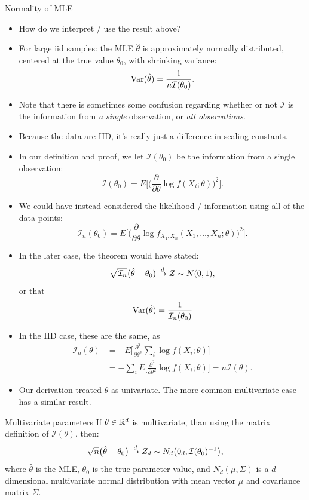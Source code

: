\begin{frame}[allowframebreaks]{Normality of MLE}
  \begin{itemize}
    \item How do we interpret / use the result above?
    \item \alert{For large iid samples:} the MLE $\hat{\theta}$ is approximately normally distributed, centered at the \alert{true} value $\theta_0$, with shrinking variance:
    $$
    \mathrm{Var}(\hat{\theta}) = \frac{1}{n\mathcal{I}(\theta_0)}.
    $$
    \item \alert{Note} that there is sometimes some confusion regarding whether or not $\mathcal{I}$ is the information from \emph{a single} observation, or \emph{all observations}.
    \item Because the data are IID, it's really just a difference in scaling constants.
    \item In our definition and proof, we let $\mathcal{I}(\theta_0)$ be the information from a single observation:
    $$
    \mathcal{I}(\theta_0) = E\Big[\Big(\frac{\partial}{\partial \theta} \log f(X_i; \theta)\Big)^2\Big].
    $$
    \item We could have instead considered the likelihood / information using all of the data points:
    $$
    \mathcal{I}_n(\theta_0) = E\Big[\Big(\frac{\partial}{\partial \theta} \log f_{X_1:X_n}(X_1, \ldots, X_n; \theta)\Big)^2\Big].
    $$
    \item In the later case, the theorem would have stated:
    $$
    \sqrt{\mathcal{I}_n}\big(\hat{\theta} - \theta_0) \overset{d}{\rightarrow} Z \sim N(0, 1),
    $$
    or that
    $$
    \mathrm{Var}(\hat{\theta}) = \frac{1}{\mathcal{I}_n(\theta_0)}
    $$
    \item In the IID case, these are the same, as
    \begin{align*}
    \mathcal{I}_n(\theta) &= -E\Big[\frac{\partial^2}{\partial \theta^2} \sum_i \log f(X_i; \theta) \Big] \\
    &= -\sum_{i} E\Big[\frac{\partial^2}{\partial \theta^2} \log f(X_i; \theta) \Big] = n \mathcal{I}(\theta).
    \end{align*}

  \framebreak

  \item Our derivation treated $\theta$ as univariate. The more common multivariate case has a similar result.

  \end{itemize}

  \begin{block}{Multivariate parameters}
    If $\theta \in \mathbb{R}^d$ is multivariate, than using the matrix definition of $\mathcal{I}(\theta)$, then:
    $$
    \sqrt{n}\big(\hat{\theta} - \theta_0\big) \overset{d}{\rightarrow} Z_d \sim N_d\big(0_d, \mathcal{I}(\theta_0)^{-1}\big),
    $$
    where $\hat{\theta}$ is the MLE, $\theta_0$ is the true parameter value, and $N_d(\mu, \Sigma)$ is a $d$-dimensional multivariate normal distribution with mean vector $\mu$ and covariance matrix $\Sigma$.
  \end{block}

\end{frame}

